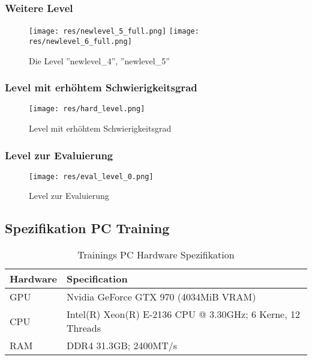 \documentclass[11pt]{scrartcl}
\begin{document}
\subsubsection{Weitere Level}
\label{sec:six_levels}

\begin{figure}[htp]
\centering
\texttt{[image: res/newlevel\_5\_full.png]}
\texttt{[image: res/newlevel\_6\_full.png]}

\caption{
  Die Level ''newlevel\_4'', ''newlevel\_5''}
\end{figure}

\subsubsection{Level mit erhöhtem Schwierigkeitsgrad}
\label{sec:hard_level_appendix}

\begin{figure}[htp]
\centering
\texttt{[image: res/hard\_level.png]}

\caption{Level mit erhöhtem Schwierigkeitsgrad}
\end{figure}

\subsubsection{Level zur Evaluierung}
\label{sec:untrained_level_appendix}

\begin{figure}[htp]
\centering
\texttt{[image: res/eval\_level\_0.png]}

\caption{Level zur Evaluierung}
\end{figure}

\newpage
\subsection{Spezifikation PC Training}
\label{sec:specs}
\begin{table}[ht]
  \begin{center}
    \begin{tabular}{l | l}
      \textbf{Hardware} & \textbf{Specification} \\
      \hline
      GPU & Nvidia GeForce GTX 970 (4034MiB VRAM)\\
      CPU & Intel(R) Xeon(R) E-2136 CPU @ 3.30GHz; 6 Kerne, 12 Threads\\
      RAM & DDR4 31.3GB; 2400MT/s
    \end{tabular}

    \caption[PC Specifikation]{Trainings PC Hardware Spezifikation}
    \label{tab:pc_specs}
  \end{center}
\end{table}
\end{document}
